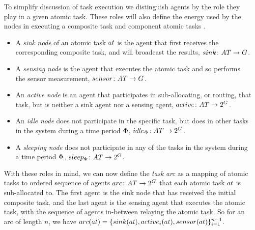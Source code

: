 To simplify discussion of task execution we distinguish agents by the role they play in a given atomic task. These roles will also define the energy used by the nodes in executing a composite task and component atomic tasks \citep{Gupta2014}.
\begin{itemize}
	\item A \textit{sink node} of an atomic task $\varAtomicTask{}{}$ is the agent that first receives the corresponding composite task, and will broadcast the results, $\formalSinkRole{}{}$.
	\item A \textit{sensing node} is the agent that executes the atomic task and so performs the sensor measurement, $\formalSenseRole{}{}$.
	\item An \textit{active node} is an agent that participates in sub-allocating, or routing, that task, but is neither a sink agent nor a sensing agent, $\formalActiveRole{}{}$.
	\item An \textit{idle node} does not participate in the specific task, but does in other tasks in the system during a time period $\Phi$, $\formalIdleRole{}{}$.
	\item A \textit{sleeping node} does not participate in any of the tasks in the system during a time period $\Phi$, $\formalSleepRole{}{}$.
\end{itemize}
With these roles in mind, we can now define the  \textit{ task arc} as a mapping of atomic tasks to ordered sequence of agents $\formalTaskArc{}{}$ that each atomic task $\varAtomicTask{}{}$ is sub-allocated to. The first agent is the sink node that has received the initial composite task, and the last agent is the sensing agent that executes the atomic task, with the sequence of agents in-between relaying the atomic task. So for an arc of length $n$, we have
$\functionTaskArc{}{} = \lbrace \functionSinkRole{}{}, \functionActiveRole{i}{}, \functionSenseRole{}{} \rbrace_{i=1}^{n-1}$. 
